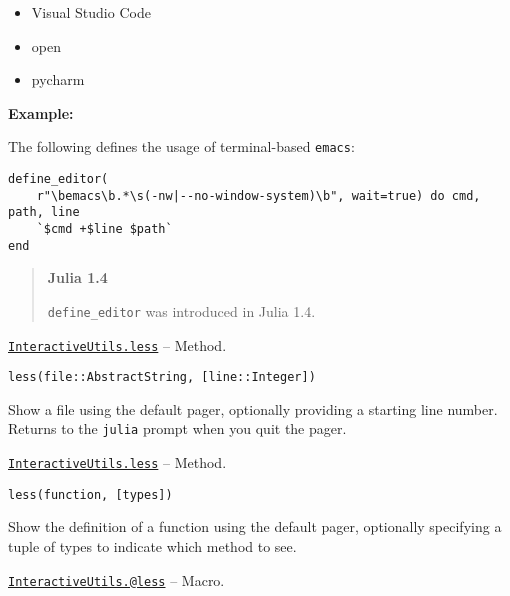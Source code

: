\begin{adjustwidth}{2em}{0pt}
\begin{itemize}
\item Visual Studio Code


\item open


\item pycharm

\end{itemize}
\textbf{Example:}

The following defines the usage of terminal-based \texttt{emacs}:


\begin{lstlisting}
define_editor(
    r"\bemacs\b.*\s(-nw|--no-window-system)\b", wait=true) do cmd, path, line
    `$cmd +$line $path`
end
\end{lstlisting}

\begin{quote}
\textbf{Julia 1.4}

\texttt{define\_editor} was introduced in Julia 1.4.

\end{quote}


\end{adjustwidth}
\hypertarget{449855233258666437}{} 
\hyperlink{449855233258666437}{\texttt{InteractiveUtils.less}}  -- {Method.}

\begin{adjustwidth}{2em}{0pt}


\begin{verbatim}
less(file::AbstractString, [line::Integer])
\end{verbatim}

Show a file using the default pager, optionally providing a starting line number. Returns to the \texttt{julia} prompt when you quit the pager.



\end{adjustwidth}
\hypertarget{16005681522948418287}{} 
\hyperlink{16005681522948418287}{\texttt{InteractiveUtils.less}}  -- {Method.}

\begin{adjustwidth}{2em}{0pt}


\begin{verbatim}
less(function, [types])
\end{verbatim}

Show the definition of a function using the default pager, optionally specifying a tuple of types to indicate which method to see.



\end{adjustwidth}
\hypertarget{8935326068247481160}{} 
\hyperlink{8935326068247481160}{\texttt{InteractiveUtils.@less}}  -- {Macro.}

